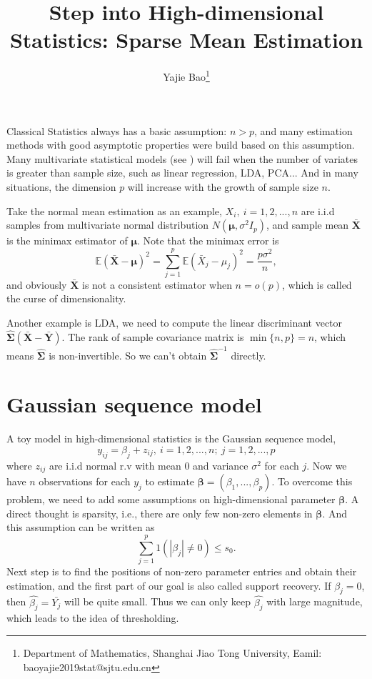\documentclass[12pt]{article}
\numberwithin{equation}{section}
\begin{document}
\title{Step into High-dimensional Statistics: Sparse Mean Estimation}

\author{Yajie Bao\thanks{Department of Mathematics, Shanghai Jiao Tong University, Eamil: baoyajie2019stat@sjtu.edu.cn}}
\maketitle
Classical Statistics always has a basic assumption: $n>p$, and many estimation methods with good asymptotic properties were build based on this assumption. Many multivariate statistical models (see \citet{anderson1958introduction}) will fail when the number of variates is greater than sample size, such as linear regression, LDA, PCA... And in many situations, the dimension $p$ will increase with the growth of sample size $n$.

Take the normal mean estimation as an example, $X_i,\ i=1,2,...,n$ are i.i.d samples from multivariate normal distribution $N(\boldsymbol{\mu},\sigma^2 I_p)$, and sample mean $\boldsymbol{\bar X}$ is the minimax estimator of $\boldsymbol{\mu}$. Note that the minimax error is
$$
\mathbb{E}\left(\boldsymbol{\bar X}-\boldsymbol{\mu}\right)^2=\sum_{j=1}^{p}\mathbb{E}\left(\bar X_j-\mu_j\right)^2=\frac{p\sigma^2}{n},
$$ 
and obviously $\boldsymbol{\bar X}$ is not a consistent estimator when $n=o(p)$, which is called  the curse of dimensionality.

Another example is LDA, we need to compute the linear discriminant vector $\boldsymbol{\widehat{\Sigma}}\left(\boldsymbol{\bar X}-\boldsymbol{\bar Y}\right)$. The rank of sample covariance matrix is $\min\{n,p\}=n$, which means $\boldsymbol{\widehat{\Sigma}}$ is non-invertible. So we can't obtain $\boldsymbol{\widehat{\Sigma}}^{-1}$ directly.
\section{Gaussian sequence model}
A toy model in high-dimensional statistics is the Gaussian sequence model, 
\begin{equation}\label{1.1}
y_{ij} = \beta_j + z_{ij},\ i=1,2,...,n;\ j=1,2,...,p
\end{equation}
where $z_{ij}$ are i.i.d normal r.v with mean 0 and variance $\sigma^2$ for each $j$. Now we have $n$ observations for each $y_j$ to estimate $\boldsymbol{\beta}=(\beta_1,...,\beta_p)$. To overcome this problem, we need to add some assumptions on high-dimensional parameter $\boldsymbol{\beta}$. A direct thought is sparsity, i.e., there are only few non-zero elements in $\boldsymbol{\beta}$. And this assumption can be written as
\begin{equation}\label{1.2}
\sum_{j=1}^p1(|\beta_j|\neq 0)\leq s_0.
\end{equation}
Next step is to find the positions of non-zero parameter entries and obtain their estimation, and the first part of our goal is also called support recovery. If $\beta_j=0$, then $\hat{\beta_j}=\bar{Y_j}$ will be quite small. Thus we can only keep $\hat{\beta_j}$ with large magnitude, which leads to the idea of thresholding. 
\end{document}
